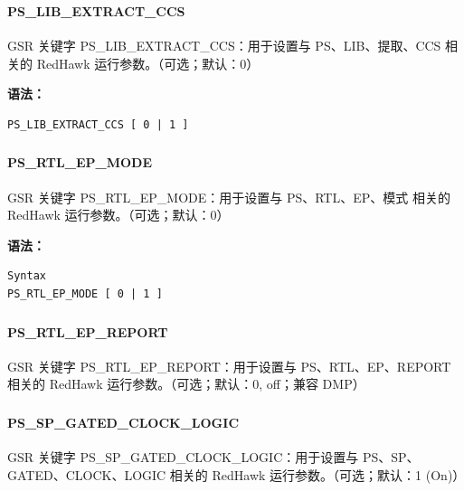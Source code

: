 \subsubsection{}
\paragraph*{PS_LIB_EXTRACT_CCS}

GSR 关键字 PS_LIB_EXTRACT_CCS：用于设置与 PS、LIB、提取、CCS 相关的 RedHawk 运行参数。（可选；默认：0）

\textbf{语法：}
\begin{lstlisting}
PS_LIB_EXTRACT_CCS [ 0 | 1 ]
\end{lstlisting}

\subsubsection{}
\paragraph*{PS_RTL_EP_MODE}

GSR 关键字 PS_RTL_EP_MODE：用于设置与 PS、RTL、EP、模式 相关的 RedHawk 运行参数。（可选；默认：0）

\textbf{语法：}
\begin{lstlisting}
Syntax
PS_RTL_EP_MODE [ 0 | 1 ]
\end{lstlisting}

\subsubsection{}
\paragraph*{PS_RTL_EP_REPORT}

GSR 关键字 PS_RTL_EP_REPORT：用于设置与 PS、RTL、EP、REPORT 相关的 RedHawk 运行参数。（可选；默认：0, off；兼容 DMP）

\subsubsection{}
\paragraph*{PS_SP_GATED_CLOCK_LOGIC}

GSR 关键字 PS_SP_GATED_CLOCK_LOGIC：用于设置与 PS、SP、GATED、CLOCK、LOGIC 相关的 RedHawk 运行参数。（可选；默认：1 (On)）

